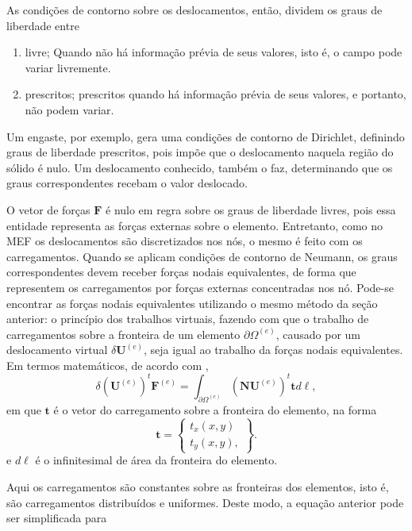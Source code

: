 As condições de contorno sobre os deslocamentos, então, dividem os graus de liberdade entre 

\begin{enumerate}
    \item livre;
    Quando não há informação prévia de seus valores, isto é, o campo pode variar livremente.
    \item prescritos;
    prescritos quando há informação prévia de seus valores, e portanto, não podem variar.
    \cite{LOGAN}
\end{enumerate}

Um engaste, por exemplo, gera uma condições de contorno de Dirichlet, definindo graus de liberdade prescritos, pois impõe que o deslocamento naquela região do sólido é nulo. Um deslocamento conhecido, também o faz, determinando que os graus correspondentes recebam o valor deslocado.

O vetor de forças $\bm{F}$ é nulo em regra sobre os graus de liberdade livres, pois essa entidade representa as forças externas sobre o elemento. Entretanto, como no MEF os deslocamentos são discretizados nos nós, o mesmo é feito com os carregamentos. Quando se aplicam condições de contorno de Neumann, os graus correspondentes devem receber forças nodais equivalentes, de forma que representem os carregamentos por forças externas concentradas nos nó. Pode-se encontrar as forças nodais equivalentes utilizando o mesmo método da seção anterior: o princípio dos trabalhos virtuais, fazendo com que o trabalho de carregamentos sobre a fronteira de um elemento $\partial \Omega^{(e)}$, causado por um deslocamento virtual $\delta \bm{U}^{(e)}$, seja igual ao trabalho da forças nodais equivalentes. Em termos matemáticos, de acordo com ,
\begin{equation}
    \delta (\bm{U}^{(e)})^t \bm{F}^{(e)} = \int_{\partial \Omega^{(e)}} (\bm{N}\bm{U}^{(e)})^t \bm{t} d \ell,
\end{equation}
em que $\bm{t}$ é o vetor do carregamento sobre a fronteira do elemento, na forma
\begin{equation}
    \bm{t} = \begin{Bmatrix}
        t_x(x,y) \\ t_y(x,y),
    \end{Bmatrix}.
\end{equation}
e $d\ell$ é o infinitesimal de área da fronteira do elemento.

Aqui os carregamentos são constantes sobre as fronteiras dos elementos, isto é, são carregamentos distribuídos e uniformes. Deste modo, a equação anterior pode ser simplificada para

